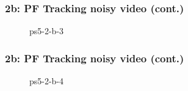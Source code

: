 \documentclass[../report.tex]{subfiles}
\begin{document}
    \begin{frame}
        \frametitle{2b: PF Tracking noisy video (cont.)}
        \begin{figure}[!htb]
            \centering
            \caption{ps5-2-b-3}
        \end{figure}
    \end{frame}

    \begin{frame}
        \frametitle{2b: PF Tracking noisy video (cont.)}
        \begin{figure}[!htb]
            \centering
            \caption{ps5-2-b-4}
        \end{figure}
    \end{frame}
    
\end{document}
